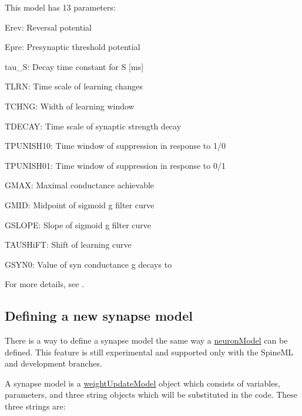 This model has 13 parameters\+:
\begin{DoxyItemize}
\item {\ttfamily Erev\+:} Reversal potential
\item {\ttfamily Epre\+:} Presynaptic threshold potential
\item {\ttfamily tau\+\_\+\+S\+:} Decay time constant for S \mbox{[}ms\mbox{]}
\item {\ttfamily T\+L\+R\+N\+:} Time scale of learning changes
\item {\ttfamily T\+C\+H\+N\+G\+:} Width of learning window
\item {\ttfamily T\+D\+E\+C\+A\+Y\+:} Time scale of synaptic strength decay
\item {\ttfamily T\+P\+U\+N\+I\+S\+H10\+:} Time window of suppression in response to 1/0
\item {\ttfamily T\+P\+U\+N\+I\+S\+H01\+:} Time window of suppression in response to 0/1
\item {\ttfamily G\+M\+A\+X\+:} Maximal conductance achievable
\item {\ttfamily G\+M\+I\+D\+:} Midpoint of sigmoid g filter curve
\item {\ttfamily G\+S\+L\+O\+P\+E\+:} Slope of sigmoid g filter curve
\item {\ttfamily T\+A\+U\+S\+Hi\+F\+T\+:} Shift of learning curve
\item {\ttfamily G\+S\+Y\+N0\+:} Value of syn conductance g decays to
\end{DoxyItemize}

For more details, see \cite{nowotny2005self}.\hypertarget{sect3_sect34}{}\subsection{Defining a new synapse model}\label{sect3_sect34}
There is a way to define a synapse model the same way a \hyperlink{structneuronModel}{neuron\+Model} can be defined. This feature is still experimental and supported only with the Spine\+M\+L and development branches.

A synapse model is a \hyperlink{classweightUpdateModel}{weight\+Update\+Model} object which consists of variables, parameters, and three string objects which will be substituted in the code. These three strings are\+:


